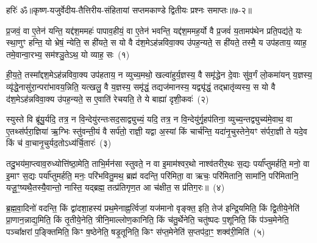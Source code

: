 {\anuvakamend[{श॒ताया॒ष्टात्रिꣳ॑शत्}]}%


{हरिः॑ ॐ}{॥कृष्ण-यजुर्वेदीय-तैत्तिरीय-संहितायां सप्तमकाण्डे द्वितीयः प्रश्नः समाप्तः॥७-२॥}



\setcounter{anuvakam}{0}
प्र॒जवं॒ वा ए॒तेन॑ यन्ति॒ यद्द॑श॒ममहः॑ पापाव॒हीयं॒ वा ए॒तेन॑ भवन्ति॒ यद्द॑श॒ममह॒र्यो वै प्र॒जवं॑ य॒तामप॑थेन प्रति॒पद्य॑ते॒ यः स्था॒णुꣳ हन्ति॒ यो भ्रेषं॒ न्येति॒ स ही॑यते॒ स यो वै द॑श॒मे\-ऽह॑न्नविवा॒क्य उ॑पह॒न्यते॒ स ही॑यते॒ तस्मै॒ य उप॑हताय॒ व्याह॒ तमे॒वान्वा॒रभ्य॒ सम॑श्ञु॒ते\-ऽथ॒ यो व्याह॒ सः~(१)\ip

ही॒य॒ते॒ तस्मा᳚द्\-दश॒मे\-ऽह॑न्नविवा॒क्य उप॑हताय॒ न व्युच्य॒मथो॒ खल्वा॑हुर्य॒ज्ञस्य॒ वै समृ॑द्धेन दे॒वाः सु॑व॒र्गं लो॒कमा॑यन् य॒ज्ञस्य॒ व्यृ॑द्धे॒नासु॑रा॒न्परा॑भावय॒न्निति॒ यत्खलु॒ वै य॒ज्ञस्य॒ समृ॑द्धं॒ तद्यज॑मानस्य॒ यद्व्यृ॑द्धं॒ तद्भ्रातृ॑व्यस्य॒ स यो वै द॑श॒मे\-ऽह॑न्नविवा॒क्य उ॑पह॒न्यते॒ स ए॒वाति॑ रेचयति॒ ते ये बाह्या॑ दृशी॒कवः॑~(२)\ip

स्युस्ते वि ब्रू॑यु॒र्यदि॒ तत्र॒ न वि॒न्देयु॑रन्तःसद॒साद्व्युच्यं॒ यदि॒ तत्र॒ न वि॒न्देयु॑र्गृ॒हप॑तिना॒ व्युच्य॒न्तद्व्युच्य॑मे॒वाथ॒ वा ए॒तथ्स॑र्परा॒ज्ञिया॑ ऋ॒ग्भिः स्तु॑वन्ती॒यं वै सर्प॑तो॒ राज्ञी॒ यद्वा अ॒स्यां किं चार्च॑न्ति॒ यदा॑नृ॒चुस्तेने॒यꣳ स॑र्परा॒ज्ञी ते यदे॒व किं च॑ वा॒चानृ॒चुर्यद॒तो\-ऽध्य॑र्चि॒तारः॑~(३)\ip

तदु॒भय॑मा॒प्त्वाव॒रुध्योत्ति॑ष्ठा॒मेति॒ ताभि॒र्मन॑सा स्तुवते॒ न वा इ॒माम॑श्वर॒थो नाश्व॑तरीर॒थः स॒द्यः पर्या᳚प्तुमर्\mbox{}हति॒ मनो॒ वा इ॒माꣳ स॒द्यः पर्या᳚प्तुमर्\mbox{}हति॒ मनः॒ परि॑भवितु॒मथ॒ ब्रह्म॑ वदन्ति॒ परि॑मिता॒ वा ऋचः॒ परि॑मितानि॒ सामा॑नि॒ परि॑मितानि॒ यजू॒ꣳ॒ष्यथै॒तस्यै॒वान्तो॒ नास्ति॒ यद्ब्रह्म॒ तत्प्र॑तिगृण॒त आ च॑क्षीत॒ स प्र॑तिग॒रः॥~(४)\ip

{\anuvakamend[{व्याह॒ स दृ॑शी॒कवो᳚\-ऽर्चि॒तारः॒ स एक॑ञ्च}]}

ब्र॒ह्म॒वा॒दिनो॑ वदन्ति॒ किं द्वा॑दशा॒हस्य॑ प्रथ॒मेनाह्न॒र्त्विजां॒ यज॑मानो वृङ्क्त॒ इति॒ तेज॑ इन्द्रि॒यमिति॒ किं द्वि॒तीये॒नेति॑ प्रा॒णान॒न्नाद्य॒मिति॒ किं तृ॒तीये॒नेति॒ त्रीनि॒माल्लोण॒कानिति॒ किं च॑तु॒र्थेनेति॒ चतु॑ष्पदः प॒शूनिति॒ किं प॑ञ्च॒मेनेति॒ पञ्चा᳚क्षरां प॒ङ्क्तिमिति॒ किꣳ ष॒ष्ठेनेति॒ षडृ॒तूनिति॒ किꣳ स॑प्त॒मेनेति॑ स॒प्तप॑दा॒ꣳ॒ शक्व॑री॒मिति॑~(५)\ip

